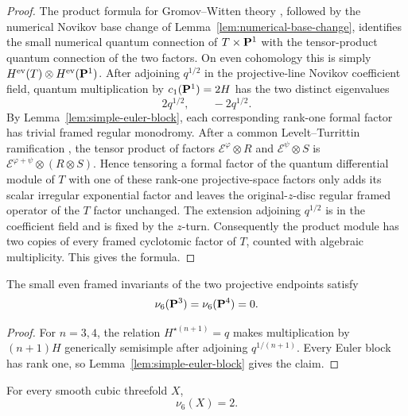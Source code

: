 \begin{proof}
The product formula for Gromov--Witten theory
\cite{BehrendProduct}, followed by the numerical Novikov base change of
Lemma~\ref{lem:numerical-base-change}, identifies the small numerical
quantum connection of $T\times\mathbf P^1$ with the tensor-product quantum
connection of the two factors.  On even cohomology this is simply
$H^{\rm ev}(T)\otimes H^{\rm ev}(\mathbf P^1)$.  After adjoining $q^{1/2}$ in
the projective-line Novikov coefficient field, quantum multiplication by
$c_1(\mathbf P^1)=2H$ has the two distinct eigenvalues
\[
 2q^{1/2},\qquad -2q^{1/2}.
\]
By Lemma~\ref{lem:simple-euler-block}, each corresponding rank-one formal
factor has trivial framed regular monodromy.  After a common
Levelt--Turrittin ramification \cite[Chapter~3]{PutSinger}, the tensor product
of factors \(\mathcal E^\varphi\otimes R\) and
\(\mathcal E^\psi\otimes S\) is
\(\mathcal E^{\varphi+\psi}\otimes(R\otimes S)\).  Hence tensoring a formal
factor of the quantum differential module of $T$ with one of these rank-one
projective-space factors only adds its
scalar irregular exponential factor and leaves the original-$z$-disc
regular framed operator of the $T$ factor unchanged.  The extension adjoining
$q^{1/2}$ is in the coefficient field and is fixed by the $z$-turn.
Consequently the product module has two copies of every framed cyclotomic
factor of $T$, counted with algebraic multiplicity.  This gives the formula.
\end{proof}

\begin{corollary}\label{cor:p3-nu6}
%
%
The small even framed invariants of the two projective endpoints satisfy
\[
 \nu_6(\mathbf P^3)=\nu_6(\mathbf P^4)=0.
\]
\end{corollary}

\begin{proof}
For $n=3,4$, the relation $H^{\star(n+1)}=q$ makes multiplication by
$(n+1)H$ generically semisimple after adjoining $q^{1/(n+1)}$.  Every Euler
block has rank one, so Lemma~\ref{lem:simple-euler-block} gives the claim.
\end{proof}

\begin{proposition}
\label{prop:cubic-packet}
%
%
For every smooth cubic threefold \(X\),
\[
 \nu_6(X)=2.
 \label{eq:cubic-packet-value}
\]
\end{proposition}

